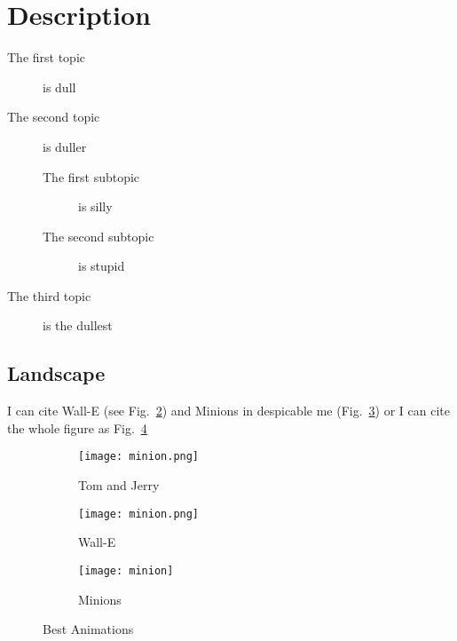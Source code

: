 \section*{Description}
\begin{description}
\item[The first topic] is dull
\item[The second topic] is duller
\begin{description}
\item[The first subtopic] is silly
\item[The second subtopic] is stupid
\end{description}
\item[The third topic] is the dullest
\end{description}


\begin{landscape}

\section{Landscape}
I can cite Wall-E (see Fig.~\ref{fig:WallE}) and Minions in despicable me (Fig.~\ref{fig:Minnion}) or I can cite the whole figure as Fig.~\ref{fig:animations}


\begin{figure}
  \centering
  \begin{subfigure}[b]{0.3\textwidth}
    \texttt{[image: minion.png]}
    \caption{Tom and Jerry}
    \label{fig:TomJerry}   
  \end{subfigure}             
  \begin{subfigure}[b]{0.3\textwidth}
    \texttt{[image: minion.png]}
    \caption{Wall-E}
    \label{fig:WallE}
  \end{subfigure}             
  \begin{subfigure}[b]{0.3\textwidth}
    \texttt{[image: minion]}
    \caption{Minions}
    \label{fig:Minnion}
  \end{subfigure}
  \caption{Best Animations}
  \label{fig:animations}
\end{figure}

\end{landscape}
